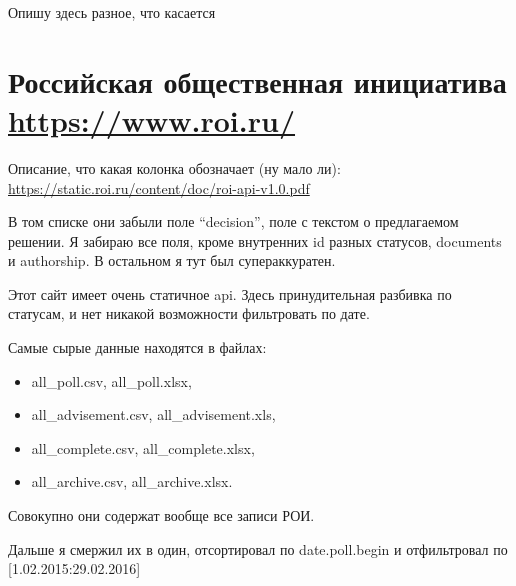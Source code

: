 \documentclass[11pt, a4paper]{article}
\begin{document}
Опишу здесь разное, что касается 

\section*{Российская общественная инициатива \url{https://www.roi.ru/}}
Описание, что какая колонка обозначает (ну мало ли): 
\url{https://static.roi.ru/content/doc/roi-api-v1.0.pdf}

В том списке они забыли поле ``decision'', поле с текстом о предлагаемом решении.
Я забираю все поля, кроме внутренних id разных статусов, documents и authorship.
В остальном я тут был супераккуратен.

Этот сайт имеет очень статичное api. Здесь принудительная разбивка по статусам, и нет никакой возможности фильтровать по дате.

Самые сырые данные находятся в файлах:
\begin{itemize}
	\item all\_poll.csv, all\_poll.xlsx,
	\item all\_advisement.csv, all\_advisement.xls,
	\item all\_complete.csv, all\_complete.xlsx,
	\item all\_archive.csv, all\_archive.xlsx.
\end{itemize}
Совокупно они содержат вообще все записи РОИ.

Дальше я смержил их в один, отсортировал по date.poll.begin и отфильтровал по [1.02.2015:29.02.2016]
\end{document}
